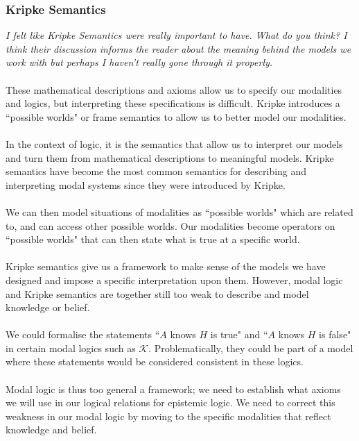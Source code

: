 \documentclass[12pt, a4paper, twoside]{article}
\begin{document}
\subsubsection{Kripke Semantics}\label{epistemic_kripke}
{\em I felt like Kripke Semantics were really important to have.
What do you think?
I think their discussion informs the reader about the meaning behind the models
we work with but perhaps I haven't really gone through it properly.}\\
\\
These mathematical descriptions and axioms allow us to specify our modalities
and logics, but interpreting these specifications is difficult.
Kripke introduces a ``possible worlds" or frame semantics to allow us to better
model our modalities. \citep{blackburn2002modal} \\
\\
In the context of logic, it is the semantics that allow us to interpret our
models and turn them from mathematical descriptions to meaningful models.
Kripke semantics have become the most common semantics for describing and
interpreting modal systems since they were introduced by Kripke.\\
\\
We can then model situations of modalities as ``possible worlds" which are
related to, and can access other possible worlds.
Our modalities become operators on ``possible worlds" that can then state what
is true at a specific world.\\
\\
Kripke semantics give us a framework to make sense of the models we have
designed and impose a specific interpretation upon them.
However, modal logic and Kripke semantics are together still too weak to
describe and model knowledge or belief.\\
\\
We could formalise the statements ``$A$ knows $H$ is true" and ``$A$ knows $H$
is false" in certain modal logics such as $\mathcal{K}$.
Problematically, they could be part of a model where these statements would be
considered consistent in these logics.\\
\\
Modal logic is thus too general a framework; we need to establish what axioms we
will use in our logical relations for epistemic logic.
We need to correct this weakness in our modal logic by moving to the specific
modalities that reflect knowledge and belief.
\end{document}
